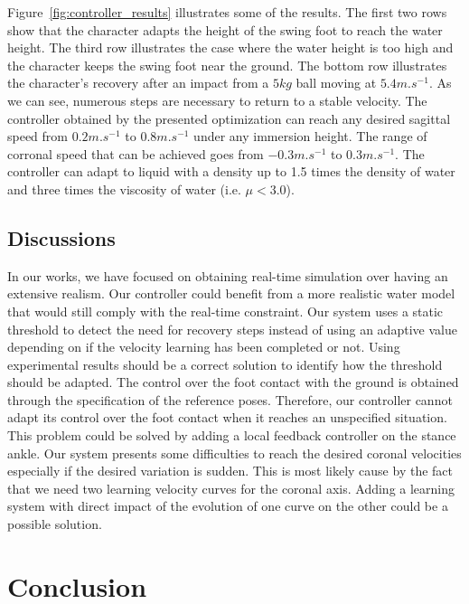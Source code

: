\documentclass[conference]{acmsiggraph}
\begin{document}
Figure~\ref{fig:controller_results} illustrates some of the results. The first two rows show that the character adapts the height of the swing foot to reach the water height. The third row illustrates the case where the water height is too high and the character keeps the swing foot near the ground. The bottom row illustrates the character's recovery after an impact from a $5kg$ ball moving at $5.4m.s^{-1}$. As we can see, numerous steps are necessary to return to a stable velocity.
The controller obtained by the presented optimization can reach any desired sagittal speed from $0.2m.s^{-1}$ to $0.8m.s^{-1}$ under any immersion height. The range of corronal speed that can be achieved goes from $-0.3m.s^{-1}$ to $0.3m.s^{-1}$. The controller can adapt to liquid with a density up to 1.5 times the density of water and three times the viscosity of water (i.e. $\mu<3.0$).

\subsection{Discussions}

In our works, we have focused on obtaining real-time simulation over having an extensive realism. Our controller could benefit from a more realistic water model that would still comply with the real-time constraint.
Our system uses a static threshold to detect the need for recovery steps instead of using an adaptive value depending on if the velocity learning has been completed or not. Using experimental results should be a correct solution to identify how the threshold should be adapted.
The control over the foot contact with the ground is obtained through the specification of the reference poses. Therefore, our controller cannot adapt its control over the foot contact when it reaches an unspecified situation. This problem could be solved by adding a local feedback controller on the stance ankle.
Our system presents some difficulties to reach the desired coronal velocities especially if the desired variation is sudden. This is most likely cause by the fact that we need two learning velocity curves for the coronal axis. Adding a learning system with direct impact of the evolution of one curve on the other could be a possible solution.


\section{Conclusion}
\label{sec:conclusion}
\end{document}
